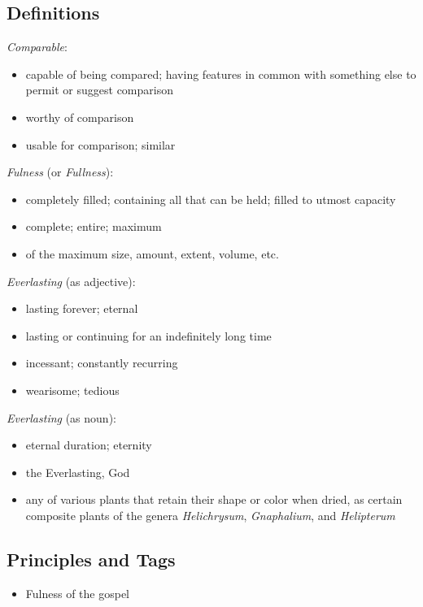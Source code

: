 \documentclass[12pt]{report}
\begin{document}
\subsection{Definitions\label{intro:DFN1}}
\emph{Comparable}: 
\begin{itemize}
  \item capable of being compared; having features in common with something else to permit or suggest comparison
  \item worthy of comparison
  \item usable for comparison; similar
\end{itemize}
\emph{Fulness} (or \emph{Fullness}): 
\begin{itemize}
  \item completely filled; containing all that can be held; filled to utmost capacity
  \item complete; entire; maximum
  \item of the maximum size, amount, extent, volume, etc.
\end{itemize}
\emph{Everlasting} (as adjective):
\begin{itemize}
  \item lasting forever; eternal
  \item lasting or continuing for an indefinitely long time
  \item incessant; constantly recurring
  \item wearisome; tedious
\end{itemize}
\emph{Everlasting} (as noun):
\begin{itemize}
  \item eternal duration; eternity
  \item the Everlasting, God
  \item any of various plants that retain their shape or color when dried, as certain composite plants of the genera \emph{Helichrysum}, \emph{Gnaphalium}, and \emph{Helipterum}
\end{itemize}

\subsection{Principles and Tags\label{intro:principles1}}
\begin{itemize}
\item {} Fulness of the gospel
\end{itemize}
\end{document}
